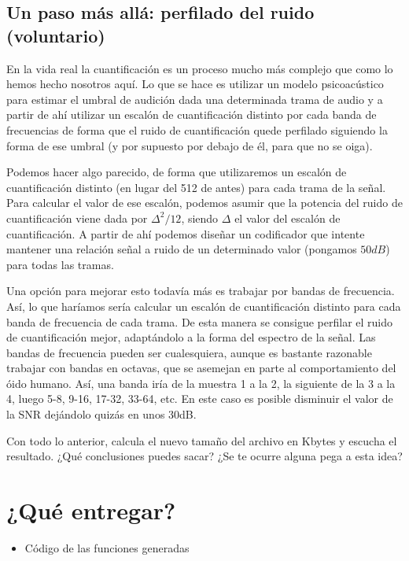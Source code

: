 \documentclass[es,practica]{uah}
\begin{document}
\subsection{Un paso más allá: perfilado del ruido (voluntario)}

En la vida real la cuantificación es un proceso mucho más complejo que como lo hemos hecho nosotros aquí. Lo que se hace es utilizar un modelo psicoacústico para estimar el umbral de audición dada una determinada trama de audio y a partir de ahí utilizar un escalón de cuantificación distinto por cada banda de frecuencias de forma que el ruido de cuantificación quede perfilado siguiendo la forma de ese umbral (y por supuesto por debajo de él, para que no se oiga).

Podemos hacer algo parecido, de forma que utilizaremos un escalón de cuantificación distinto (en lugar del 512 de antes) para cada trama de la señal. Para calcular el valor de ese escalón, podemos asumir que la potencia del ruido de cuantificación viene dada por $\Delta^2 /12$, siendo $\Delta$ el valor del escalón de cuantificación. A partir de ahí podemos diseñar un codificador que intente mantener una relación señal a ruido de un determinado valor (pongamos $50 dB$) para todas las tramas. 

Una opción para mejorar esto todavía más es trabajar por bandas de frecuencia. Así, lo que haríamos sería calcular un escalón de cuantificación distinto para cada banda de frecuencia de cada trama. De esta manera se consigue perfilar el ruido de cuantificación mejor, adaptándolo a la forma del espectro de la señal. Las bandas de frecuencia pueden ser cualesquiera, aunque es bastante razonable trabajar con bandas en octavas, que se asemejan en parte al comportamiento del óido humano. Así, una banda iría de la muestra 1 a la 2, la siguiente de la 3 a la 4, luego 5-8, 9-16, 17-32, 33-64, etc. En este caso es posible disminuir el valor de la SNR dejándolo quizás en unos 30dB. 

Con todo lo anterior, calcula el nuevo tamaño del archivo en Kbytes y escucha el resultado. ¿Qué conclusiones puedes sacar? ¿Se te ocurre alguna pega a esta idea?

\section{¿Qué entregar?}
\begin{itemize}
	\item Código de las funciones generadas
\end{itemize}
\end{document}
